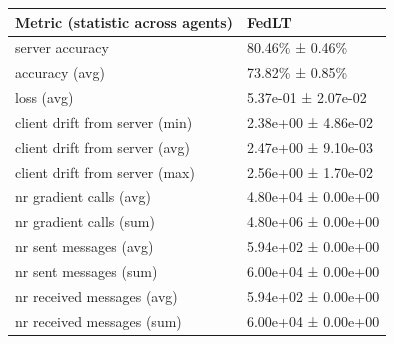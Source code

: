 \begin{tabular}{ll}
\hline
 Metric (statistic across agents)   & FedLT               \\
\hline
 server accuracy                    & 80.46\% ± 0.46\%      \\
 accuracy (avg)                     & 73.82\% ± 0.85\%      \\
 loss (avg)                         & 5.37e-01 ± 2.07e-02 \\
 client drift from server (min)     & 2.38e+00 ± 4.86e-02 \\
 client drift from server (avg)     & 2.47e+00 ± 9.10e-03 \\
 client drift from server (max)     & 2.56e+00 ± 1.70e-02 \\
 nr gradient calls (avg)            & 4.80e+04 ± 0.00e+00 \\
 nr gradient calls (sum)            & 4.80e+06 ± 0.00e+00 \\
 nr sent messages (avg)             & 5.94e+02 ± 0.00e+00 \\
 nr sent messages (sum)             & 6.00e+04 ± 0.00e+00 \\
 nr received messages (avg)         & 5.94e+02 ± 0.00e+00 \\
 nr received messages (sum)         & 6.00e+04 ± 0.00e+00 \\
\hline
\end{tabular}
